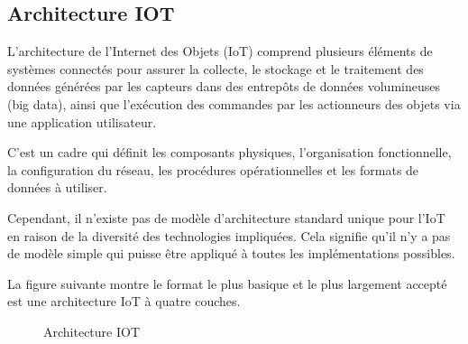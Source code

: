 \documentclass{report}
\begin{document}
\subsection{Architecture IOT}
L'architecture de l'Internet des Objets (IoT) comprend plusieurs éléments de systèmes connectés pour assurer la collecte, le stockage et le traitement des données générées par les capteurs dans des entrepôts de données volumineuses (big data), ainsi que l'exécution des commandes par les actionneurs des objets via une application utilisateur.

C'est un cadre qui définit les composants physiques, l'organisation fonctionnelle, la configuration du réseau, les procédures opérationnelles et les formats de données à utiliser.

Cependant, il n'existe pas de modèle d'architecture standard unique pour l'IoT en raison de la diversité des technologies impliquées. Cela signifie qu'il n'y a pas de modèle simple qui puisse être appliqué à toutes les implémentations possibles.
\vspace*{0.2cm}

La figure suivante montre le format le plus basique et le plus largement accepté est une architecture IoT à quatre couches.\cite{Web 6 : iotindustriel.com}
  \begin{figure}[h]
        \centering
        \caption{Architecture IOT \cite{Web 6 : iotindustriel.com}}
        \label{b}
    \end{figure}
\vspace*{0.5cm}
\end{document}
